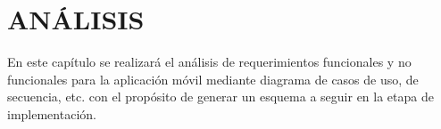 \chapter{ANÁLISIS}
En este capítulo se realizará el análisis de requerimientos funcionales y no funcionales para la aplicación móvil mediante diagrama de casos de uso, de secuencia, etc. con el propósito de generar un esquema a seguir en la etapa de implementación.